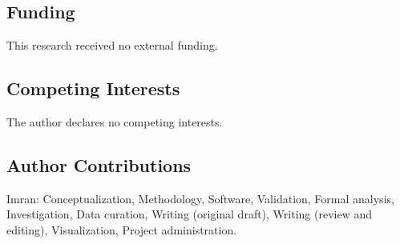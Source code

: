 \documentclass[10pt,journal]{IEEEtran}
\begin{document}
\subsection*{Funding}
This research received no external funding.

\subsection*{Competing Interests}
The author declares no competing interests.

\subsection*{Author Contributions}
Imran: Conceptualization, Methodology, Software, Validation, Formal analysis, Investigation, Data curation, Writing (original draft), Writing (review and editing), Visualization, Project administration.



\end{document}
